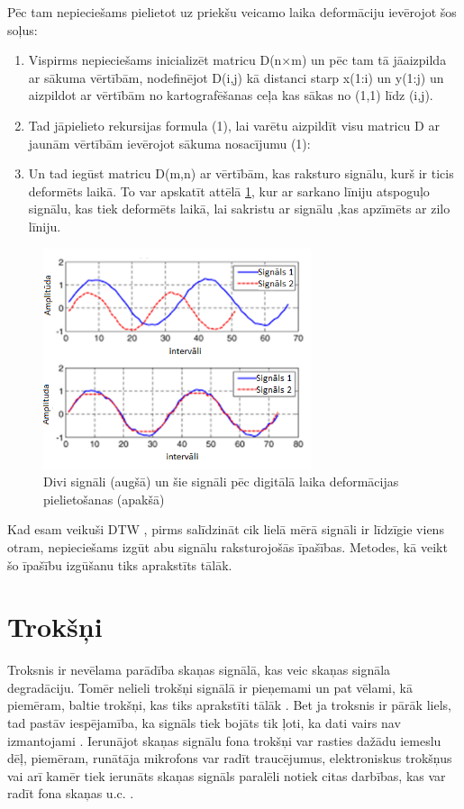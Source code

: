 \documentclass[12pt,paper=A4]{report}
\begin{document}
Pēc tam nepieciešams pielietot uz priekšu veicamo laika deformāciju ievērojot šos soļus:
\begin{enumerate}

\item Vispirms nepieciešams inicializēt matricu D(n$\times$m) un pēc tam tā jāaizpilda ar sākuma vērtībām, nodefinējot D(i,j) kā distanci starp x(1:i) un y(1:j) un aizpildot ar vērtībām no kartografēšanas ceļa kas sākas no (1,1) līdz (i,j).
\item Tad jāpielieto rekursijas formula (1), lai varētu aizpildīt visu matricu D ar jaunām vērtībām ievērojot sākuma nosacījumu (1):
\item Un tad iegūst matricu D(m,n) ar vērtībām, kas raksturo signālu, kurš ir ticis deformēts laikā. To var apskatīt attēlā \ref{dynamic-time}, kur ar sarkano līniju atspoguļo signālu, kas tiek deformēts laikā, lai sakristu ar signālu ,kas apzīmēts ar zilo līniju. 

\end{enumerate}

\begin{figure}[H] \centering
\includegraphics[width=0.70\textwidth]{asdd} 
\caption{Divi signāli (augšā) un šie signāli pēc digitālā laika deformācijas pielietošanas (apakšā) \cite{dtw3}}  \label{dynamic-time}
\end{figure}

Kad esam veikuši DTW \cite{DTWalgoritm}, pirms salīdzināt cik lielā mērā signāli ir līdzīgie viens otram, nepieciešams izgūt abu signālu raksturojošās īpašības. Metodes, kā veikt šo īpašību izgūšanu tiks aprakstīts tālāk. 
\FloatBarrier

\section{Trokšņi}
Troksnis ir nevēlama parādība skaņas signālā, kas veic skaņas signāla degradāciju. Tomēr nelieli trokšņi signālā ir pieņemami un pat vēlami, kā piemēram, baltie trokšņi, kas tiks aprakstīti tālāk \cite{Noises}.
Bet ja troksnis ir pārāk liels, tad pastāv iespējamība, ka signāls tiek bojāts tik ļoti, ka dati vairs nav izmantojami \cite{Pacienta-runas-kvalitātes-noteikšanas-automatizētas-sistēmas-izstrāde}.
Ierunājot skaņas signālu fona trokšņi var rasties dažādu iemeslu dēļ, piemēram, runātāja mikrofons var radīt traucējumus, elektroniskus trokšņus vai arī kamēr tiek ierunāts skaņas signāls paralēli notiek citas darbības, kas var radīt fona skaņas u.c. \cite{noi1}. 
\end{document}
